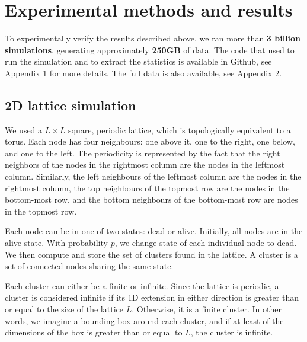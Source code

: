 
\chapter{Experimental methods and results} 




To experimentally verify the results described above, we ran more than \textbf{3 billion simulations}, generating approximately \textbf{250GB} of data. The code that used to run the simulation and to extract the statistics is available in Github, see Appendix 1 for more details. The full data is also available, see Appendix 2. 


\section{2D lattice simulation}


We used a $L \times L$ square, periodic lattice, which is topologically equivalent to a torus. Each node has four neighbours: one above it, one to the right, one below, and one to the left. The periodicity is represented by the fact that the right neighbors of the nodes in the rightmost column are the nodes in the leftmost column. Similarly, the left neighbours of the leftmost column are the nodes in the rightmost column, the top neighbours of the topmost row are the nodes in the bottom-most row, and the bottom neighbours of the bottom-most row are nodes in the topmost row.

Each node can be in one of two states: dead or alive. Initially, all nodes are in the alive state. With probability $p$, we change state of each individual node to dead. We then compute and store the set of clusters found in the lattice. A cluster is a set of connected nodes sharing the same state. 

Each cluster can either be a finite or infinite. Since the lattice is periodic, a cluster is considered infinite if its 1D extension in either direction is greater than or equal to the size of the lattice $L$. Otherwise, it is a finite cluster. In other words, we imagine a bounding box around each cluster, and if at least of the dimensions of the box is greater than or equal to $L$, the cluster is infinite. 

